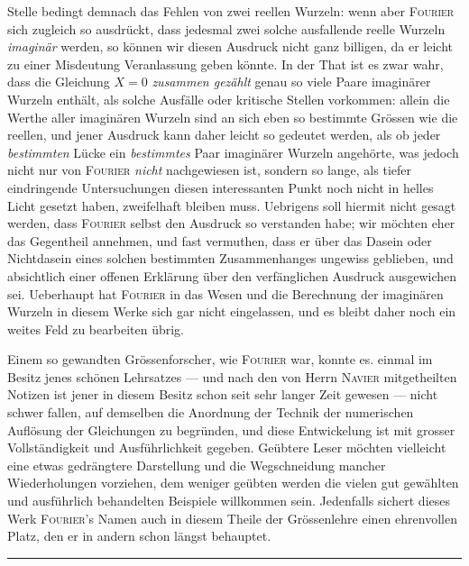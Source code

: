 Stelle bedingt demnach das Fehlen von zwei reellen Wurzeln: wenn aber \textsc{Fourier} sich zugleich so ausdrückt, dass jedesmal zwei solche ausfallende reelle Wurzeln \textit{imaginär} werden, so können wir diesen Ausdruck nicht ganz billigen, da er leicht zu einer Misdeutung Veranlassung geben könnte. In der That ist es zwar wahr, dass die Gleichung $X=0$ \textit{zusammen gezählt} genau so viele Paare imaginärer Wurzeln enthält, als solche Ausfälle oder kritische Stellen vorkommen: allein die Werthe aller imaginären Wurzeln sind an sich eben so bestimmte Grössen wie die reellen, und jener Ausdruck kann daher leicht so gedeutet werden, als ob jeder \textit{bestimmten} Lücke ein \textit{bestimmtes} Paar imaginärer Wurzeln angehörte, was jedoch nicht nur von \textsc{Fourier} \textit{nicht} nachgewiesen ist, sondern so lange, als tiefer eindringende Untersuchungen diesen interessanten Punkt noch nicht in helles Licht gesetzt haben, zweifelhaft bleiben muss. Uebrigens soll hiermit nicht gesagt werden, dass \textsc{Fourier} selbst den Ausdruck so verstanden habe; wir möchten eher das Gegentheil annehmen, und fast vermuthen, dass er über das Dasein oder Nichtdasein eines solchen bestimmten Zusammenhanges ungewiss geblieben, und absichtlich einer offenen Erklärung über den verfänglichen Ausdruck ausgewichen sei. Ueberhaupt hat \textsc{Fourier} in das Wesen und die Berechnung der imaginären Wurzeln in diesem Werke sich gar nicht eingelassen, und es bleibt daher noch ein weites Feld zu bearbeiten übrig.\par
Einem so gewandten Grössenforscher, wie \textsc{Fourier} war, konnte es. einmal im Besitz jenes schönen Lehrsatzes --- und nach den von Herrn \textsc{Navier} mitgetheilten Notizen ist jener in diesem Besitz schon seit sehr langer Zeit gewesen --- nicht schwer fallen, auf demselben die Anordnung der Technik der numerischen Auflösung der Gleichungen zu begründen, und diese Entwickelung ist mit grosser Vollständigkeit und Ausführlichkeit gegeben. Geübtere Leser möchten vielleicht eine etwas gedrängtere Darstellung und die Wegschneidung mancher Wiederholungen vorziehen, dem weniger geübten werden die vielen gut gewählten und ausführlich behandelten Beispiele willkommen sein. Jedenfalls sichert dieses Werk \textsc{Fourier}'s Namen auch in diesem Theile der Grössenlehre einen ehrenvollen Platz, den er in andern schon längst behauptet.\par
\par\noindent\hfill\rule{0.30\linewidth}{0.4pt}\hfill\mbox{}\par

